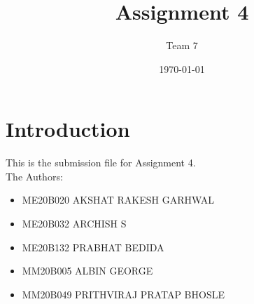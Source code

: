 \documentclass[12pt,a4paper]{article}
\begin{document}
\title{Assignment 4}
\author{Team 7}
\date{\today}
\maketitle

\tableofcontents

\section{Introduction}
This is the submission file for Assignment 4. \\
The Authors:
\begin{itemize}
	\item ME20B020 AKSHAT RAKESH GARHWAL
	\item ME20B032 ARCHISH S
	\item ME20B132 PRABHAT BEDIDA
\listoffigures	

	\item MM20B005 ALBIN GEORGE
	\item MM20B049 PRITHVIRAJ PRATAP BHOSLE
\end{itemize}




 
\end{document}
